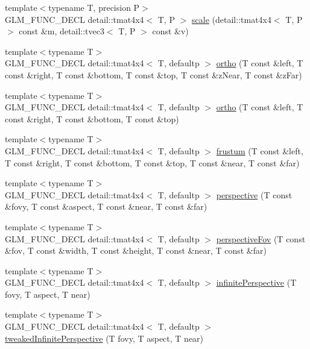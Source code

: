 \begin{CompactItemize}
{\footnotesize template$<$typename T, precision P$>$ }\\GLM\_\-FUNC\_\-DECL detail::tmat4x4$<$ T, P $>$ \hyperlink{group__gtc__matrix__transform_g5e2bf1cdf124863558884751d611aea6}{scale} (detail::tmat4x4$<$ T, P $>$ const \&m, detail::tvec3$<$ T, P $>$ const \&v)
\item 
{\footnotesize template$<$typename T$>$ }\\GLM\_\-FUNC\_\-DECL detail::tmat4x4$<$ T, defaultp $>$ \hyperlink{group__gtc__matrix__transform_gf420978f35ff47883f417cef1e4d6a15}{ortho} (T const \&left, T const \&right, T const \&bottom, T const \&top, T const \&zNear, T const \&zFar)
\item 
{\footnotesize template$<$typename T$>$ }\\GLM\_\-FUNC\_\-DECL detail::tmat4x4$<$ T, defaultp $>$ \hyperlink{group__gtc__matrix__transform_gdab1dbf2b9ceda856624bafa09b3de07}{ortho} (T const \&left, T const \&right, T const \&bottom, T const \&top)
\item 
{\footnotesize template$<$typename T$>$ }\\GLM\_\-FUNC\_\-DECL detail::tmat4x4$<$ T, defaultp $>$ \hyperlink{group__gtc__matrix__transform_g0ef39da6d6c83806dea5ff455eb225cf}{frustum} (T const \&left, T const \&right, T const \&bottom, T const \&top, T const \&near, T const \&far)
\item 
{\footnotesize template$<$typename T$>$ }\\GLM\_\-FUNC\_\-DECL detail::tmat4x4$<$ T, defaultp $>$ \hyperlink{group__gtc__matrix__transform_g6f705d60660ad2d4ef540ca0bb59273e}{perspective} (T const \&fovy, T const \&aspect, T const \&near, T const \&far)
\item 
{\footnotesize template$<$typename T$>$ }\\GLM\_\-FUNC\_\-DECL detail::tmat4x4$<$ T, defaultp $>$ \hyperlink{group__gtc__matrix__transform_gc9db4ea8ecdcb00f1d06d29603b5df52}{perspectiveFov} (T const \&fov, T const \&width, T const \&height, T const \&near, T const \&far)
\item 
{\footnotesize template$<$typename T$>$ }\\GLM\_\-FUNC\_\-DECL detail::tmat4x4$<$ T, defaultp $>$ \hyperlink{group__gtc__matrix__transform_g2b5303a99580dc5a2ffe4cd9303397a9}{infinitePerspective} (T fovy, T aspect, T near)
\item 
{\footnotesize template$<$typename T$>$ }\\GLM\_\-FUNC\_\-DECL detail::tmat4x4$<$ T, defaultp $>$ \hyperlink{group__gtc__matrix__transform_ge918d92c6d1fc5c0f97ac96d66e90b6a}{tweakedInfinitePerspective} (T fovy, T aspect, T near)

\end{CompactItemize}
